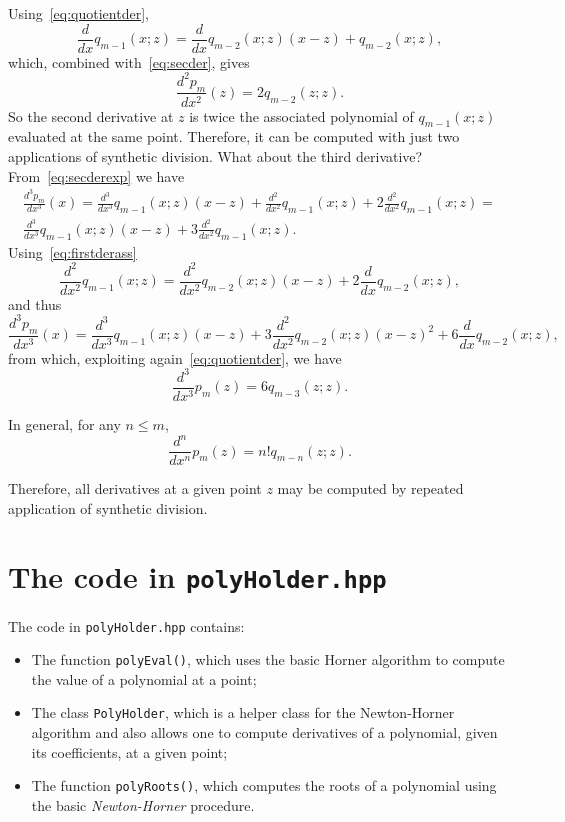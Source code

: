 \documentclass[10pt,a4paper]{article}
\theoremstyle{definition}%
\begin{document}
Using~\eqref{eq:quotientder},
\begin{equation}\label{eq:firstderass}
\frac{d}{dx}q_{m-1}(x;z)=\frac{d}{dx}q_{m-2}(x;z)(x-z)+ q_{m-2}(x;z),
\end{equation}
which, combined with~\eqref{eq:secder}, gives
\begin{equation}\label{eq:secderivative}
\frac{d^2p_m}{dx^2}(z)=2 q_{m-2}(z;z).
\end{equation}
So the second derivative at $z$ is twice the associated polynomial of $q_{m-1}(x;z)$ evaluated at the same point. Therefore, it can be computed with just two applications of synthetic division.
What about the third derivative? From~\eqref{eq:secderexp} we have
\begin{multline}\label{eq:secderexptwo}
\frac{d^3p_m}{dx^3}(x)=\frac{d^3}{dx^3}q_{m-1}(x;z)(x-z) +\frac{d^2}{dx^2}q_{m-1}(x;z) + 2 \frac{d^2}{dx^2} q_{m-1}(x;z)=\\
\frac{d^3}{dx^3}q_{m-1}(x;z)(x-z) +3\frac{d^2}{dx^2}q_{m-1}(x;z).
\end{multline}
Using~\eqref{eq:firstderass}
\begin{equation}
\frac{d^2}{dx^2}q_{m-1}(x;z)=\frac{d^2}{dx^2}q_{m-2}(x;z)(x-z)+2\frac{d}{dx}q_{m-2}(x;z),
\end{equation}
and thus
\begin{equation}\label{eq:thirdder}
\frac{d^3p_m}{dx^3}(x)=
\frac{d^3}{dx^3}q_{m-1}(x;z)(x-z) +3\frac{d^2}{dx^2}q_{m-2}(x;z)(x-z)^2 + 6\frac{d}{dx}q_{m-2}(x;z),
\end{equation}
from which, exploiting again~\eqref{eq:quotientder}, we have
\begin{equation}\label{eq:thirdderz}
\frac{d^3}{dx^3}p_m(z)=6 q_{m-3}(z;z).
\end{equation}

In general, for any $n\le m$,
\begin{equation}
\boxed{\frac{d^n}{dx^n}p_m(z)=n! q_{m-n}(z;z).}
\end{equation}

Therefore, all derivatives at a given point $z$ may be computed by repeated application of synthetic division.


\section{The code in \texttt{polyHolder.hpp}}
The code in \texttt{polyHolder.hpp} contains:
\begin{itemize}
    \item The function \lstinline|polyEval()|, which uses the basic Horner algorithm to compute the value of a polynomial at a point;
    \item The class \lstinline|PolyHolder|, which is a helper class for the Newton-Horner algorithm and also allows one to compute derivatives of a polynomial, given its coefficients, at a given point;
    \item The function \lstinline|polyRoots()|, which computes the roots of a polynomial using the basic \emph{Newton-Horner} procedure.
\end{itemize}
\end{document}
